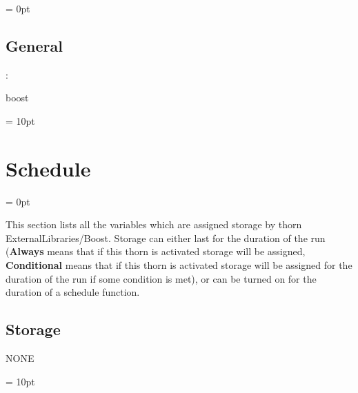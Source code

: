 \parskip = 0pt

\vspace{3mm} \subsection*{General}

: 

boost
\vspace{2mm}

\vspace{5mm}\parskip = 10pt 

\section{Schedule} 


\parskip = 0pt


\noindent This section lists all the variables which are assigned storage by thorn ExternalLibraries/Boost.  Storage can either last for the duration of the run ({\bf Always} means that if this thorn is activated storage will be assigned, {\bf Conditional} means that if this thorn is activated storage will be assigned for the duration of the run if some condition is met), or can be turned on for the duration of a schedule function.


\subsection*{Storage}NONE

\vspace{5mm}\parskip = 10pt 


